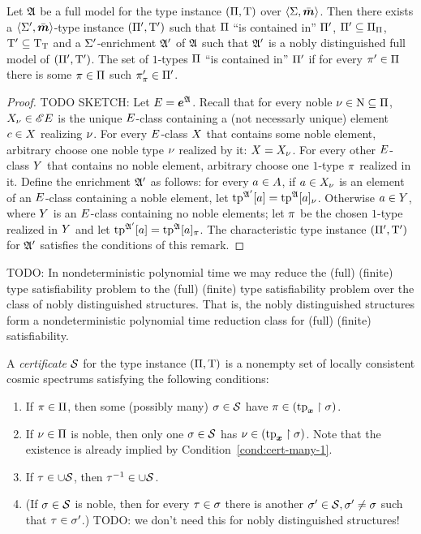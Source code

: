 \begin{remark}
Let $\mathfrak{A}$ be a full model for the type instance $(\Pi,\mathrm{T})$ over
$\left\langle \mathrm{\Sigma},\bar{\bm{m}} \right\rangle$.
Then there exists a
$\left\langle \mathrm{\Sigma'},\bar{\bm{m}} \right\rangle$-type instance $(\Pi',\mathrm{T}')$ such that $\Pi$ ``is
contained in'' $\Pi'$, $\Pi' \subseteq \Pi_\Pi$, $\mathrm{T}' \subseteq
\mathrm{T}_{\mathrm{T}}$ and a $\mathrm{\Sigma'}$-enrichment $\mathfrak{A'}$ of $\mathfrak{A}$ such that $\mathfrak{A'}$ is a nobly
distinguished full model of $(\Pi',\mathrm{T}')$.
The set of $1$-types $\Pi$ ``is contained in'' $\Pi'$ if for every $\pi'
\in \Pi$ there is some $\pi \in \Pi$ such $\pi_\pi' \in \Pi'$.
\end{remark}
\begin{proof}TODO SKETCH:
Let $E = \bm{e}^{\mathfrak{A}}$.
Recall that for every noble $\nu \in \mathrm{N} \subseteq \Pi$, $X_\nu \in
{\mathscr{E}E}$ is the unique $E$-class containing a (not necessarly unique)
element $c \in X$ realizing $\nu$. For every $E$-class $X$ that
contains some noble element, arbitrary choose one noble type $\nu$ realized by
it: $X = X_\nu$. For every other $E$-class $Y$ that contains
no noble element, arbitrary choose one $1$-type $\pi$ realized in it.
Define the enrichment $\mathfrak{A'}$ as follows: for every $a \in A$, if $a
\in X_\nu$ is an element of an $E$-class containing a noble element,
let $\operatorname{tp}^{\mathfrak{A'}}[a] = \operatorname{tp}^{\mathfrak{A}}[a]_\nu$. Otherwise $a \in Y$, where
$Y$ is an $E$-class containing no noble elements; let $\pi$ be the
chosen $1$-type realized in $Y$ and let $\operatorname{tp}^{\mathfrak{A'}}[a] =
\operatorname{tp}^{\mathfrak{A}}[a]_\pi$. The characteristic type instance $(\Pi',\mathrm{T}')$ for
$\mathfrak{A'}$ satisfies the conditions of this remark.
\end{proof}
TODO: In nondeterministic polynomial time we may reduce the (full) (finite) type
satisfiability problem to the (full) (finite) type satisfiability problem over
the class of nobly distinguished structures. That is, the nobly distinguished
structures form a nondeterministic polynomial time reduction class for (full)
(finite) satisfiability.
\begin{definition}
A \emph{certificate} $\mathcal{S}$ for the type instance $(\Pi,\mathrm{T})$ is a
nonempty set of locally consistent cosmic spectrums satisfying the following
conditions:
\begin{enumerate}
  \item\label{cond:cert-many-1} If $\pi \in \Pi$, then some (possibly many)
  $\sigma \in \mathcal{S}$ have $\pi \in (\operatorname{tp}_{\bm{x}}\restriction \sigma)$.
  \item\label{cond:cert-many-2} If $\nu \in \Pi$ is noble, then only one
  $\sigma \in \mathcal{S}$ has $\nu \in (\operatorname{tp}_{\bm{x}}\restriction \sigma)$. Note that the
  existence is already implied by Condition~\ref{cond:cert-many-1}.
  \item\label{cond:cert-many-3} If $\tau \in \cup\mathcal{S}$, then $\tau^{-1} \in
  \cup\mathcal{S}$.
  \item\label{cond:cert-many-4} (If $\sigma\in\mathcal{S}$ is noble, then for every
  $\tau \in \sigma$ there is another $\sigma'\in\mathcal{S}, \sigma' \neq \sigma$ such
  that $\tau \in \sigma'$.) TODO: we don't need this for nobly distinguished
  structures!
\end{enumerate}
\end{definition}
